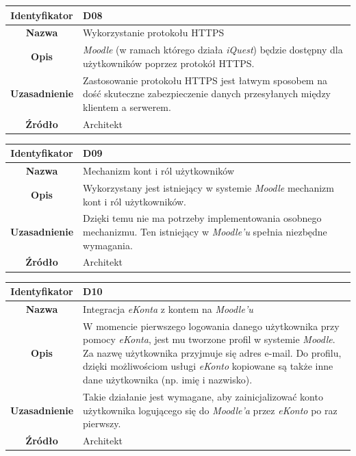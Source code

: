 \begin{table}[H]
\centering
\begin{tabular}{ | >{\bfseries}c | p{11cm} | }
\hline
%
Identyfikator & D08 \\ \hline
Nazwa & Wykorzystanie protokołu HTTPS \\ \hline
Opis & \textit{Moodle} (w ramach którego działa \textit{iQuest}) będzie dostępny dla użytkowników poprzez protokół HTTPS. \\ \hline
Uzasadnienie & Zastosowanie protokołu HTTPS jest łatwym sposobem na dość skuteczne zabezpieczenie danych przesyłanych między klientem a serwerem. \\ \hline
Źródło & Architekt \\ \hline
%
\end{tabular}
\end{table}

\begin{table}[H]
\centering
\begin{tabular}{ | >{\bfseries}c | p{11cm} | }
\hline
%
Identyfikator & D09 \\ \hline
Nazwa & Mechanizm kont i ról użytkowników \\ \hline
Opis & Wykorzystany jest istniejący w systemie \textit{Moodle} mechanizm kont i ról użytkowników. \\ \hline
Uzasadnienie & Dzięki temu nie ma potrzeby implementowania osobnego mechanizmu. Ten istniejący w \textit{Moodle'u} spełnia niezbędne wymagania. \\ \hline
Źródło & Architekt \\ \hline
%
\end{tabular}
\end{table}

\begin{table}[H]
\centering
\begin{tabular}{ | >{\bfseries}c | p{11cm} | }
\hline
%
Identyfikator & D10 \\ \hline
Nazwa & Integracja \textit{eKonta} z kontem na \textit{Moodle'u} \\ \hline
Opis & W momencie pierwszego logowania danego użytkownika przy pomocy \textit{eKonta}, jest mu tworzone profil w systemie \textit{Moodle}. Za nazwę użytkownika przyjmuje się adres e-mail. Do profilu, dzięki możliwościom usługi \textit{eKonto} kopiowane są także inne dane użytkownika (np. imię i nazwisko). \\ \hline
Uzasadnienie & Takie działanie jest wymagane, aby zainicjalizować konto użytkownika logującego się do \textit{Moodle'a} przez \textit{eKonto} po raz pierwszy. \\ \hline
Źródło & Architekt \\ \hline
%
\end{tabular}
\end{table}

